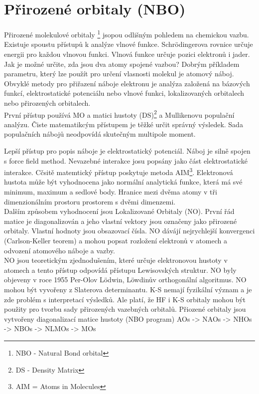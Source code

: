 \documentclass[
  digital, %
  table,   %
  lof,     %
  lot,     %
  oneside,
]{fithesis3}
\begin{document}
\section{Přirozené orbitaly (NBO)}
Přirozené molekulové orbitaly \footnote{NBO - Natural Bond orbital} jsopou odlišným pohledem na chemickou vazbu. Existuje spoustu přístupů k analýze vlnové funkce. Schrödingerova rovnice určuje energii pro každou vlnovou funkci. Vlnová funkce určuje pozici elektronů i jader. Jak je možné určite, zda jsou dva atomy spojené vazbou? Dobrým příkladem parametru, který lze použít pro určení vlasnosti molekul je atomový náboj. Obvyklé metody pro přiřazení náboje elektronu je analýza založená na bázových funkcí, elektrostatické potenciálu nebo vlnové funkci, lokalizovaných orbitalech nebo přirozených orbitalech. \\
První přístup používá MO a matici hustoty (DS)\footnote{DS - Density Matrix} a Mullikenovu populační analýzu. Čiste matematikcým přístupem je těžké určit správný výsledek. Sada populačních nábojů neodpovídá skutečným multipole moment.

Lepší přístup pro popis náboje je elektrostatický potenciál. Náboj je silně spojen s force field method. Nevazebné interakce josu popsány jako část elektrostatické interakce. Cčsitě matemtický přístup poskytuje metoda AIM\footnote{AIM = Atoms in Molecules}. Elektronová hustota může být vyhodnocena jako normální analytická funkce, která má své minimum, maximum a sedlové body. Hranice mezi dvěma atomy v tři dimenzionálním prostoru prostorem s dvěmi dimenzemi. \\
Dalším způsobem vyhodnocení jsou Lokalizované Orbitaly (NO).  První řád matice je diagonalizován a jeho vlastní vektory jsou označeny jako přirozené orbitaly. Vlastní hodnoty jsou obsazovací čísla. NO dávájí nejrychlejší konvergenci (Carlson-Keller teorem) a mohou popsat rozložení elektronů v atomech a odvození atomového náboje a vazby.  \cite{jensen2007introduction} \\
 NO jsou teoretickým zjednodušením, které určuje elektronovou hustoty v atomech a  tento přístup odpovídá přístupu Lewisovských struktur. NO byly objeveny v roce 1955 Per-Olov Lödwin, Löwdinův orthogonální algoritmus. NO mohou být vyvořeny z Slaterova determinantu. K-S nemají fyzikální význam a je zde problém s interpretací výsledků. Ale platí, že HF i K-S orbitaly mohou být použity pro tvorbu sady přirozených vazebných orbitalů. Přiozené orbitaly jsou vytvořeny diagonalizací matice hustoty
(NBO program)
 AOs -> NAOs -> NHOs -> NBOs -> NLMOs -> MOs
\end{document}
